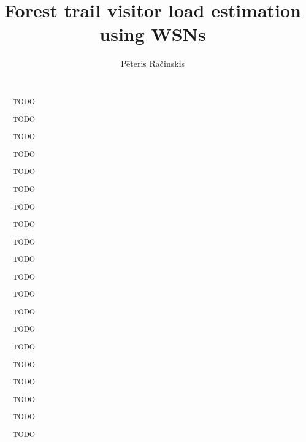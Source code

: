 \documentclass[10pt,nocopyrightspace]{ewsn-proc}
\author{
\alignauthor Pēteris Račinskis \\
    \affaddr{University of Latvia}\\
    \email{pr13001@edu.lu.lv}
}
\title{Forest trail visitor load estimation using WSNs}
\begin{document}
\maketitle

\begin{abstract}
TODO

TODO 

TODO

TODO

TODO

TODO

TODO 

TODO

TODO

TODO

TODO

TODO 

TODO

TODO

TODO

TODO

TODO 

TODO

TODO

TODO

\end{abstract}

%
%

%
\end{document}
